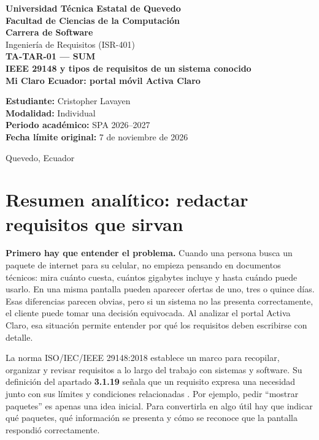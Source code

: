 \documentclass[12pt,a4paper]{article}
\begin{document}
\begin{titlepage}
\begin{center}
{\Large\bfseries Universidad Técnica Estatal de Quevedo}\\[0.4cm]
{\bfseries Facultad de Ciencias de la Computación}\\[0.2cm]
{\bfseries Carrera de Software}\\[0.85cm]
{\Large Ingeniería de Requisitos (ISR-401)}\\[1.3cm]
{\LARGE\bfseries TA-TAR-01 --- SUM}\\[0.45cm]
{\Large\bfseries IEEE 29148 y tipos de requisitos de un sistema conocido}\\[0.8cm]
{\large\bfseries Mi Claro Ecuador: portal móvil Activa Claro}\\[1.35cm]
\end{center}
\noindent\textbf{Estudiante:} Cristopher Lavayen\\[0.2cm]
\textbf{Modalidad:} Individual\\[0.2cm]
\textbf{Periodo académico:} SPA 2026--2027\\[0.2cm]
\textbf{Fecha límite original:} 7 de noviembre de 2026
\vfill
\begin{center}Quevedo, Ecuador\end{center}
\end{titlepage}
\section{Resumen analítico: redactar requisitos que sirvan}

\textbf{Primero hay que entender el problema.} Cuando una persona busca un paquete de internet para su celular, no empieza pensando en documentos técnicos: mira cuánto cuesta, cuántos gigabytes incluye y hasta cuándo puede usarlo. En una misma pantalla pueden aparecer ofertas de uno, tres o quince días. Esas diferencias parecen obvias, pero si un sistema no las presenta correctamente, el cliente puede tomar una decisión equivocada. Al analizar el portal Activa Claro, esa situación permite entender por qué los requisitos deben escribirse con detalle.

La norma ISO/IEC/IEEE 29148:2018 establece un marco para recopilar, organizar y revisar requisitos a lo largo del trabajo con sistemas y software. Su definición del apartado \textbf{3.1.19} señala que un requisito expresa una necesidad junto con sus límites y condiciones relacionadas \cite{ieee29148}. Por ejemplo, pedir ``mostrar paquetes'' es apenas una idea inicial. Para convertirla en algo útil hay que indicar qué paquetes, qué información se presenta y cómo se reconoce que la pantalla respondió correctamente.
\end{document}
